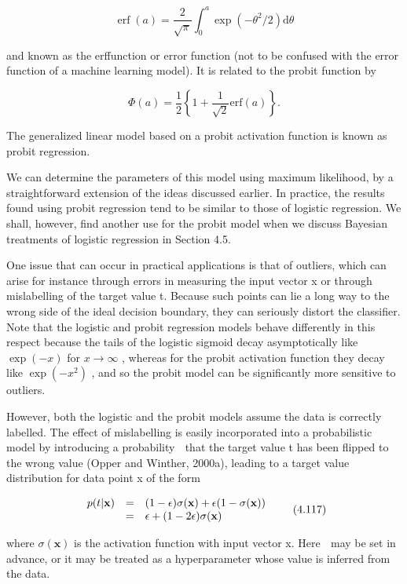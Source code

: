 \documentclass[
  10
]{article}
\begin{document}
\[
\operatorname{erf} (a) = \frac {2}{\sqrt {\pi}} \int_ {0} ^ {a} \exp (- \theta^ {2} / 2) \mathrm{d} \theta\tag{4.115}
\]

and known as the erffunction or error function (not to be confused with
the error function of a machine learning model). It is related to the
probit function by

\[
\Phi (a) = \frac {1}{2} \left\{1 + \frac {1}{\sqrt {2}} \mathrm{erf} (a) \right\}.\tag{4.116}
\]

The generalized linear model based on a probit activation function is
known as probit regression.

We can determine the parameters of this model using maximum likelihood,
by a straightforward extension of the ideas discussed earlier. In
practice, the results found using probit regression tend to be similar
to those of logistic regression. We shall, however, find another use for
the probit model when we discuss Bayesian treatments of logistic
regression in Section 4.5.

One issue that can occur in practical applications is that of outliers,
which can arise for instance through errors in measuring the input
vector x or through mislabelling of the target value t. Because such
points can lie a long way to the wrong side of the ideal decision
boundary, they can seriously distort the classifier. Note that the
logistic and probit regression models behave differently in this respect
because the tails of the logistic sigmoid decay asymptotically like
\(\exp ( - x )\) for \(x \to \infty\) , whereas for the probit
activation function they decay like \(\exp ( - x ^ { 2 } )\) , and so
the probit model can be significantly more sensitive to outliers.

However, both the logistic and the probit models assume the data is
correctly labelled. The effect of mislabelling is easily incorporated
into a probabilistic model by introducing a probability  that the target
value t has been flipped to the wrong value (Opper and Winther, 2000a),
leading to a target value distribution for data point x of the form

\[
\begin{array}{r c l} p (t | \mathbf {x}) & = & (1 - \epsilon) \sigma (\mathbf {x}) + \epsilon (1 - \sigma (\mathbf {x})) \\ & = & \epsilon + (1 - 2 \epsilon) \sigma (\mathbf {x}) \end{array}\tag{4.117}
\]

where \(\sigma ( \mathbf { x } )\) is the activation function with input
vector x. Here  may be set in advance, or it may be treated as a
hyperparameter whose value is inferred from the data.
\end{document}

